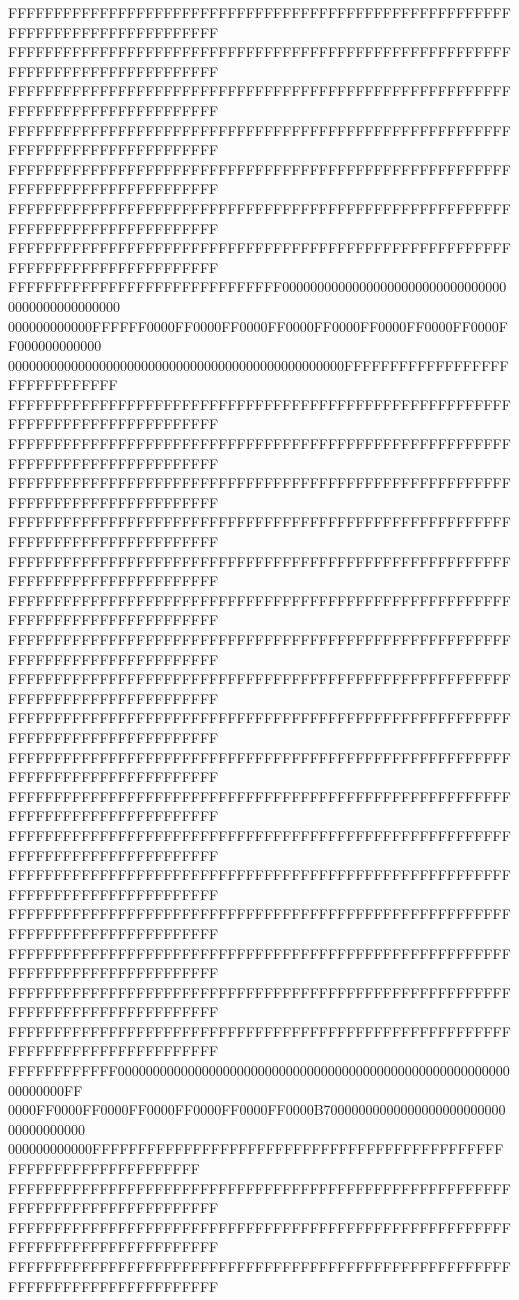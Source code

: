 FFFFFFFFFFFFFFFFFFFFFFFFFFFFFFFFFFFFFFFFFFFFFFFFFFFFFFFFFFFFFFFFFFFFFFFFFFFFFF
FFFFFFFFFFFFFFFFFFFFFFFFFFFFFFFFFFFFFFFFFFFFFFFFFFFFFFFFFFFFFFFFFFFFFFFFFFFFFF
FFFFFFFFFFFFFFFFFFFFFFFFFFFFFFFFFFFFFFFFFFFFFFFFFFFFFFFFFFFFFFFFFFFFFFFFFFFFFF
FFFFFFFFFFFFFFFFFFFFFFFFFFFFFFFFFFFFFFFFFFFFFFFFFFFFFFFFFFFFFFFFFFFFFFFFFFFFFF
FFFFFFFFFFFFFFFFFFFFFFFFFFFFFFFFFFFFFFFFFFFFFFFFFFFFFFFFFFFFFFFFFFFFFFFFFFFFFF
FFFFFFFFFFFFFFFFFFFFFFFFFFFFFFFFFFFFFFFFFFFFFFFFFFFFFFFFFFFFFFFFFFFFFFFFFFFFFF
FFFFFFFFFFFFFFFFFFFFFFFFFFFFFFFFFFFFFFFFFFFFFFFFFFFFFFFFFFFFFFFFFFFFFFFFFFFFFF
FFFFFFFFFFFFFFFFFFFFFFFFFFFFFF000000000000000000000000000000000000000000000000
000000000000FFFFFF0000FF0000FF0000FF0000FF0000FF0000FF0000FF0000FF000000000000
000000000000000000000000000000000000000000000000FFFFFFFFFFFFFFFFFFFFFFFFFFFFFF
FFFFFFFFFFFFFFFFFFFFFFFFFFFFFFFFFFFFFFFFFFFFFFFFFFFFFFFFFFFFFFFFFFFFFFFFFFFFFF
FFFFFFFFFFFFFFFFFFFFFFFFFFFFFFFFFFFFFFFFFFFFFFFFFFFFFFFFFFFFFFFFFFFFFFFFFFFFFF
FFFFFFFFFFFFFFFFFFFFFFFFFFFFFFFFFFFFFFFFFFFFFFFFFFFFFFFFFFFFFFFFFFFFFFFFFFFFFF
FFFFFFFFFFFFFFFFFFFFFFFFFFFFFFFFFFFFFFFFFFFFFFFFFFFFFFFFFFFFFFFFFFFFFFFFFFFFFF
FFFFFFFFFFFFFFFFFFFFFFFFFFFFFFFFFFFFFFFFFFFFFFFFFFFFFFFFFFFFFFFFFFFFFFFFFFFFFF
FFFFFFFFFFFFFFFFFFFFFFFFFFFFFFFFFFFFFFFFFFFFFFFFFFFFFFFFFFFFFFFFFFFFFFFFFFFFFF
FFFFFFFFFFFFFFFFFFFFFFFFFFFFFFFFFFFFFFFFFFFFFFFFFFFFFFFFFFFFFFFFFFFFFFFFFFFFFF
FFFFFFFFFFFFFFFFFFFFFFFFFFFFFFFFFFFFFFFFFFFFFFFFFFFFFFFFFFFFFFFFFFFFFFFFFFFFFF
FFFFFFFFFFFFFFFFFFFFFFFFFFFFFFFFFFFFFFFFFFFFFFFFFFFFFFFFFFFFFFFFFFFFFFFFFFFFFF
FFFFFFFFFFFFFFFFFFFFFFFFFFFFFFFFFFFFFFFFFFFFFFFFFFFFFFFFFFFFFFFFFFFFFFFFFFFFFF
FFFFFFFFFFFFFFFFFFFFFFFFFFFFFFFFFFFFFFFFFFFFFFFFFFFFFFFFFFFFFFFFFFFFFFFFFFFFFF
FFFFFFFFFFFFFFFFFFFFFFFFFFFFFFFFFFFFFFFFFFFFFFFFFFFFFFFFFFFFFFFFFFFFFFFFFFFFFF
FFFFFFFFFFFFFFFFFFFFFFFFFFFFFFFFFFFFFFFFFFFFFFFFFFFFFFFFFFFFFFFFFFFFFFFFFFFFFF
FFFFFFFFFFFFFFFFFFFFFFFFFFFFFFFFFFFFFFFFFFFFFFFFFFFFFFFFFFFFFFFFFFFFFFFFFFFFFF
FFFFFFFFFFFFFFFFFFFFFFFFFFFFFFFFFFFFFFFFFFFFFFFFFFFFFFFFFFFFFFFFFFFFFFFFFFFFFF
FFFFFFFFFFFFFFFFFFFFFFFFFFFFFFFFFFFFFFFFFFFFFFFFFFFFFFFFFFFFFFFFFFFFFFFFFFFFFF
FFFFFFFFFFFFFFFFFFFFFFFFFFFFFFFFFFFFFFFFFFFFFFFFFFFFFFFFFFFFFFFFFFFFFFFFFFFFFF
FFFFFFFFFFFF0000000000000000000000000000000000000000000000000000000000000000FF
0000FF0000FF0000FF0000FF0000FF0000FF0000B7000000000000000000000000000000000000
000000000000FFFFFFFFFFFFFFFFFFFFFFFFFFFFFFFFFFFFFFFFFFFFFFFFFFFFFFFFFFFFFFFFFF
FFFFFFFFFFFFFFFFFFFFFFFFFFFFFFFFFFFFFFFFFFFFFFFFFFFFFFFFFFFFFFFFFFFFFFFFFFFFFF
FFFFFFFFFFFFFFFFFFFFFFFFFFFFFFFFFFFFFFFFFFFFFFFFFFFFFFFFFFFFFFFFFFFFFFFFFFFFFF
FFFFFFFFFFFFFFFFFFFFFFFFFFFFFFFFFFFFFFFFFFFFFFFFFFFFFFFFFFFFFFFFFFFFFFFFFFFFFF
